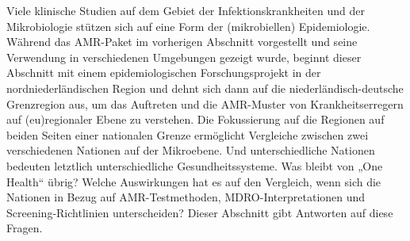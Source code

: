 \documentclass[
]{book}
\begin{document}
Viele klinische Studien auf dem Gebiet der Infektionskrankheiten und der Mikrobiologie stützen sich auf eine Form der (mikrobiellen) Epidemiologie. Während das AMR-Paket im vorherigen Abschnitt vorgestellt und seine Verwendung in verschiedenen Umgebungen gezeigt wurde, beginnt dieser Abschnitt mit einem epidemiologischen Forschungsprojekt in der nordniederländischen Region und dehnt sich dann auf die niederländisch-deutsche Grenzregion aus, um das Auftreten und die AMR-Muster von Krankheitserregern auf (eu)regionaler Ebene zu verstehen. Die Fokussierung auf die Regionen auf beiden Seiten einer nationalen Grenze ermöglicht Vergleiche zwischen zwei verschiedenen Nationen auf der Mikroebene. Und unterschiedliche Nationen bedeuten letztlich unterschiedliche Gesundheitssysteme. Was bleibt von „One Health`` übrig? Welche Auswirkungen hat es auf den Vergleich, wenn sich die Nationen in Bezug auf AMR-Testmethoden, MDRO-Interpretationen und Screening-Richtlinien unterscheiden? Dieser Abschnitt gibt Antworten auf diese Fragen.
\end{document}
